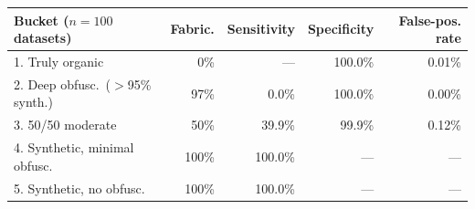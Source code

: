 \begin{tabular}{@{}lrrrr@{}}
\toprule
\textbf{Bucket ($n{=}100$ datasets)} & \textbf{Fabric.} & \textbf{Sensitivity} & \textbf{Specificity} & \textbf{False-pos. rate} \\
\midrule
1. Truly organic & 0\% & --- & 100.0\% & 0.01\% \\
2. Deep obfusc.\ ($>$95\% synth.) & 97\% & 0.0\% & 100.0\% & 0.00\% \\
3. 50/50 moderate & 50\% & 39.9\% & 99.9\% & 0.12\% \\
4. Synthetic, minimal obfusc. & 100\% & 100.0\% & --- & --- \\
5. Synthetic, no obfusc. & 100\% & 100.0\% & --- & --- \\
\bottomrule
\end{tabular}
